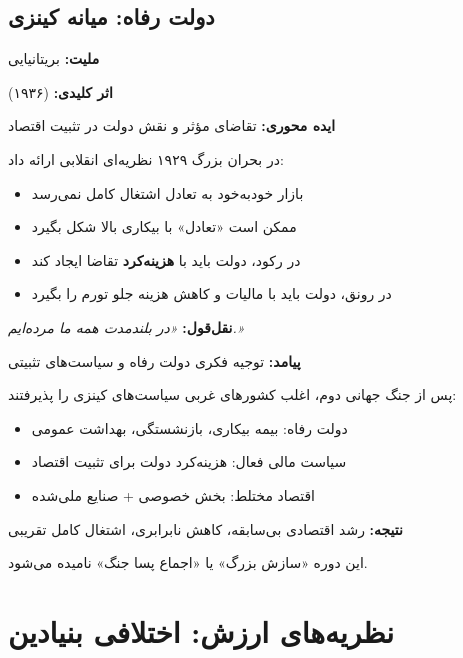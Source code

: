 \subsection{دولت رفاه: میانه کینزی}

\begin{personbox}

\textbf{ملیت:} بریتانیایی

\textbf{اثر کلیدی:}  (۱۹۳۶)

\textbf{ایده محوری:} تقاضای مؤثر و نقش دولت در تثبیت اقتصاد

\mediumspace

 در بحران بزرگ ۱۹۲۹ نظریه‌ای انقلابی ارائه داد:
\begin{itemize}[nosep]
    \item بازار خودبه‌خود به تعادل اشتغال کامل نمی‌رسد
    \item ممکن است «تعادل» با بیکاری بالا شکل بگیرد
    \item در رکود، دولت باید با \textbf{هزینه‌کرد} تقاضا ایجاد کند
    \item در رونق، دولت باید با مالیات و کاهش هزینه جلو تورم را بگیرد
\end{itemize}

\mediumspace

\textbf{نقل‌قول:} \textit{«در بلندمدت همه ما مرده‌ایم.»}

\mediumspace

\textbf{پیامد:} توجیه فکری دولت رفاه و سیاست‌های تثبیتی
\end{personbox}

\begin{historybox}
پس از جنگ جهانی دوم، اغلب کشورهای غربی سیاست‌های کینزی را پذیرفتند:
\begin{itemize}[nosep]
    \item دولت رفاه: بیمه بیکاری، بازنشستگی، بهداشت عمومی
    \item سیاست مالی فعال: هزینه‌کرد دولت برای تثبیت اقتصاد
    \item اقتصاد مختلط: بخش خصوصی + صنایع ملی‌شده
\end{itemize}
\textbf{نتیجه:} رشد اقتصادی بی‌سابقه، کاهش نابرابری، اشتغال کامل تقریبی

این دوره «سازش بزرگ» یا «اجماع پسا جنگ» نامیده می‌شود.
\end{historybox}

\section{نظریه‌های ارزش: اختلافی بنیادین}

